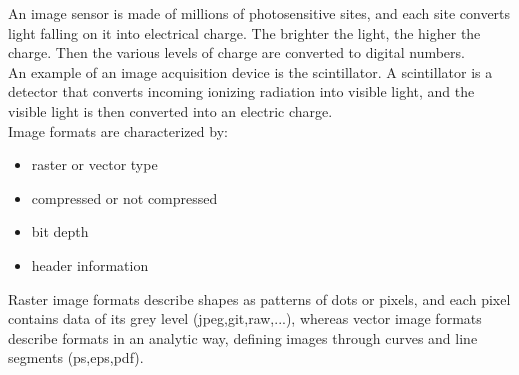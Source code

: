 An image sensor is made of millions of photosensitive sites, and each site converts light falling on it into electrical charge. The brighter the light, the higher the charge. Then the various levels of charge are converted to digital numbers. \\
An example of an image acquisition device is the scintillator. A scintillator is a detector that converts incoming ionizing radiation into visible light, and the visible light is then converted into an electric charge. \\ 



Image formats are characterized by:
\begin{itemize}
	\item raster or vector type
	\item compressed or not compressed
	\item bit depth
	\item header information
\end{itemize}
Raster image formats describe shapes as patterns of dots or pixels, and each pixel contains data of its grey level (jpeg,git,raw,...), whereas vector image formats describe formats in an analytic way, defining images through curves and line segments (ps,eps,pdf).
